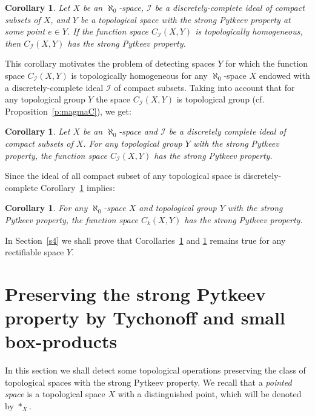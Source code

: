 \documentclass{amsart}
\newtheorem{corollary}[theorem]{Corollary}
\theoremstyle{definition}
\begin{document}
\begin{corollary}\label{c:homoPyt} Let $X$ be an $\aleph_0$-space, ${\mathcal I}$ be a discretely-complete ideal of compact subsets of $X$, and $Y$ be a topological space with the strong Pytkeev property at some point $e\in Y$. If the function space $C_{\mathcal I}(X,Y)$ is topologically homogeneous, then $C_{\mathcal I}(X,Y)$ has the strong Pytkeev property.
\end{corollary}

This corollary motivates the problem of detecting spaces $Y$ for which the function space $C_{\mathcal I}(X,Y)$ is topologically homogeneous for any $\aleph_0$-space $X$ endowed with a  discretely-complete ideal ${\mathcal I}$ of compact subsets. Taking into account that for any topological group $Y$ the space $C_{\mathcal I}(X,Y)$ is topological group (cf. Proposition~\ref{p:magmaC}), we get:

\begin{corollary}\label{c:groupPyt} Let $X$ be an $\aleph_0$-space and ${\mathcal I}$ be a discretely complete ideal of compact subsets of $X$. For any topological group $Y$ with the strong Pytkeev property, the
function space $C_{\mathcal I}(X,Y)$ has the strong Pytkeev property.
\end{corollary}

Since the ideal of all compact subset of any topological space is discretely-complete Corollary~\ref{c:groupPyt} implies:

\begin{corollary}\label{c:groupPytc} For any $\aleph_0$-space $X$ and topological group $Y$ with the strong Pytkeev property, the
function space $C_k(X,Y)$ has the strong Pytkeev property.
\end{corollary}

In Section~\ref{s4} we shall prove that Corollaries~\ref{c:groupPyt} and \ref{c:groupPytc} remains true for any rectifiable space $Y$.

\section{Preserving the strong Pytkeev property by Tychonoff and small box-products}\label{s3}

In this section we shall detect some topological operations preserving the class of topological spaces with the strong Pytkeev property. We recall that a {\em pointed space} is a topological space $X$ with a distinguished point, which will be denoted by $*_X$.
\end{document}
